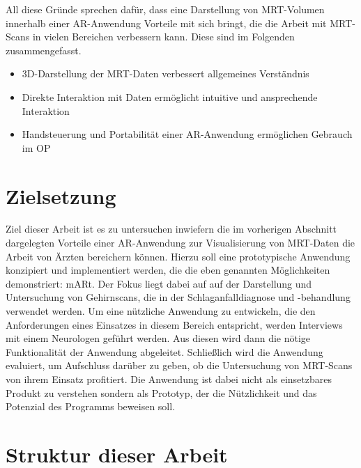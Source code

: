 All diese Gründe sprechen dafür, dass eine Darstellung von MRT-Volumen innerhalb einer AR-Anwendung Vorteile mit sich bringt, die die Arbeit mit MRT-Scans in vielen Bereichen verbessern kann. Diese sind im Folgenden zusammengefasst.

\begin{itemize}
\item 3D-Darstellung der MRT-Daten verbessert allgemeines Verständnis 
\item Direkte Interaktion mit Daten ermöglicht intuitive und ansprechende Interaktion
\item Handsteuerung und Portabilität einer AR-Anwendung ermöglichen Gebrauch im OP
\end{itemize}

\section{Zielsetzung}

Ziel dieser Arbeit ist es zu untersuchen inwiefern die im vorherigen Abschnitt dargelegten Vorteile einer AR-Anwendung zur Visualisierung von MRT-Daten die Arbeit von Ärzten bereichern können.
Hierzu soll eine prototypische Anwendung konzipiert und implementiert werden, die die eben genannten Möglichkeiten demonstriert: mARt. 
Der Fokus liegt dabei auf auf der Darstellung und Untersuchung von Gehirnscans, die in der Schlaganfalldiagnose und -behandlung verwendet werden.
Um eine nützliche Anwendung zu entwickeln, die den Anforderungen eines Einsatzes in diesem Bereich entspricht, werden Interviews mit einem Neurologen geführt werden. Aus diesen wird dann die nötige Funktionalität der Anwendung abgeleitet. 
Schließlich wird die Anwendung evaluiert, um Aufschluss darüber zu geben, ob die Untersuchung von MRT-Scans von ihrem Einsatz profitiert.
Die Anwendung ist dabei nicht als einsetzbares Produkt zu verstehen sondern als Prototyp, der die Nützlichkeit und das Potenzial des Programms beweisen soll.

\section{Struktur dieser Arbeit}

